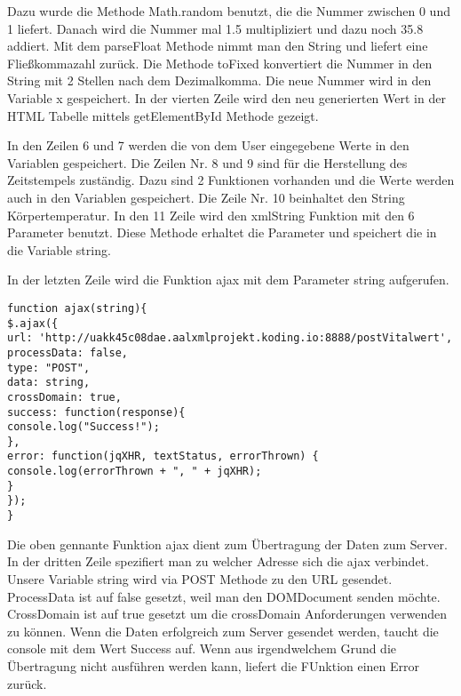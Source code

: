 Dazu wurde die Methode Math.random benutzt, die die Nummer zwischen 0 und 1 liefert. Danach wird die Nummer mal 1.5 multipliziert und dazu noch 35.8 addiert. Mit dem parseFloat Methode nimmt man den String und liefert eine Fließkommazahl zurück.  Die Methode toFixed konvertiert die Nummer in den String mit 2 Stellen nach dem Dezimalkomma. Die neue Nummer wird in den Variable x gespeichert. In der vierten Zeile wird den neu generierten Wert in der HTML Tabelle mittels getElementById Methode gezeigt.

In den Zeilen 6 und 7 werden die von dem User eingegebene Werte in den Variablen gespeichert. Die Zeilen Nr. 8 und 9 sind für die Herstellung des Zeitstempels zuständig. Dazu sind 2 Funktionen vorhanden und die Werte werden auch in den Variablen gespeichert. Die Zeile Nr. 10 beinhaltet den String Körpertemperatur. In den 11 Zeile wird den xmlString Funktion mit den 6 Parameter benutzt. Diese Methode erhaltet die Parameter und speichert die in die Variable string.

In der letzten Zeile wird die Funktion ajax mit dem Parameter string aufgerufen.
\\
\begin{lstlisting}
function ajax(string){
$.ajax({
url: 'http://uakk45c08dae.aalxmlprojekt.koding.io:8888/postVitalwert', 
processData: false,
type: "POST",
data: string,
crossDomain: true,
success: function(response){
console.log("Success!");
},
error: function(jqXHR, textStatus, errorThrown) {
console.log(errorThrown + ", " + jqXHR);
}
});
}
\end{lstlisting}

Die oben gennante Funktion ajax dient zum Übertragung der Daten zum Server. In der dritten Zeile spezifiert man zu welcher Adresse sich die ajax verbindet. Unsere Variable string wird via POST Methode zu den URL gesendet. ProcessData ist auf false gesetzt, weil man den DOMDocument senden möchte. CrossDomain ist auf true gesetzt um die crossDomain Anforderungen verwenden zu können. Wenn die Daten erfolgreich zum Server gesendet werden, taucht die console mit dem Wert Success auf. Wenn aus irgendwelchem Grund die Übertragung nicht ausführen werden kann, liefert die FUnktion einen Error zurück.   
     
